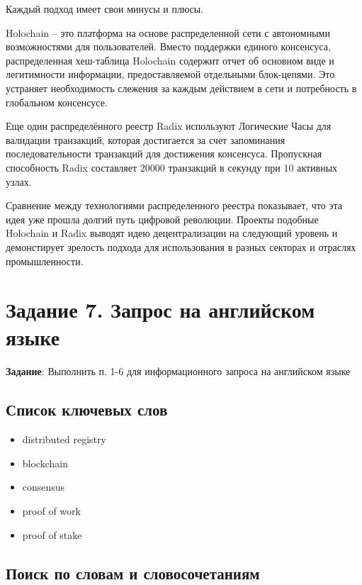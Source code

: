 \documentclass[a4paper, 12pt]{report}		%
\begin{document}
Каждый подход имеет свои минусы и плюсы.

Holochain -- это платформа на основе распределенной сети с автономными возможностями для пользователей. Вместо поддержки единого консенсуса, распределенная хеш-таблица Holochain содержит отчет об основном виде и легитимности информации, предоставляемой отдельными блок-цепями. Это устраняет необходимость слежения за каждым действием в сети и потребность в глобальном консенсусе.

Еще один распределённого реестр Radix используют Логические Часы для валидации транзакций, которая достигается за счет запоминания последовательности транзакций для достижения консенсуса. Пропускная способность Radix составляет 20000 транзакций в секунду при 10 активных узлах.

Сравнение между технологиями распределенного реестра показывает, что эта идея уже прошла долгий путь цифровой революции. Проекты подобные Holochain и Radix выводят идею децентрализации на следующий уровень и демонстирует зрелость подхода для использования в разных секторах и отраслях промышленности.

\chapter*{Задание 7. Запрос на английском языке}

\textbf{Задание}: Выполнить п. 1-6 для информационного запроса на английском языке

\section*{Список ключевых слов}

\begin{itemize}
\item distributed registry
\item blockchain
\item consensus
\item proof of work
\item proof of stake
\end{itemize}

\section*{Поиск по словам и словосочетаниям}
\end{document}

